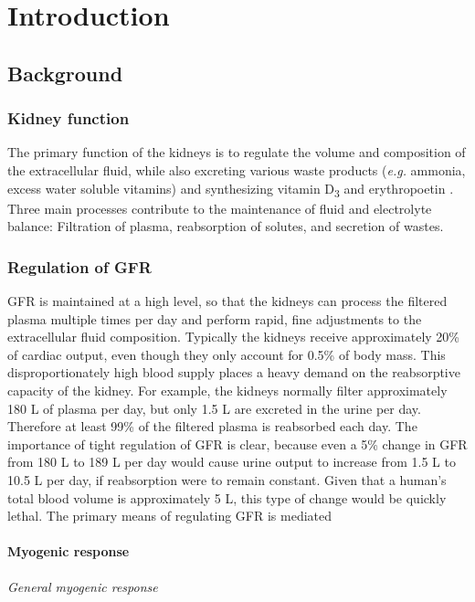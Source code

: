 \chapter{Introduction}

\section{Background}
	\subsection{Kidney function}
		The primary function of the kidneys is to regulate the volume and composition of the extracellular fluid, while also excreting various waste products (\emph{e.g.} ammonia, excess water soluble vitamins) and synthesizing vitamin D\textsubscript{3} and erythropoetin \cite{GuytonHall}. Three main processes contribute to the maintenance of fluid and electrolyte balance: Filtration of plasma, reabsorption of solutes, and secretion of wastes.
		
	\subsection{Regulation of GFR}
		GFR is maintained at a high level, so that the kidneys can process the filtered plasma multiple times per day and perform rapid, fine adjustments to the extracellular fluid composition. Typically the kidneys receive approximately 20\% of cardiac output, even though they only account for 0.5\% of body mass. This disproportionately high blood supply places a heavy demand on the reabsorptive capacity of the kidney. For example, the kidneys normally filter approximately 180 L of plasma per day, but only 1.5 L are excreted in the urine per day. Therefore at least 99\% of the filtered plasma is reabsorbed each day. The importance of tight regulation of GFR is clear, because even a 5\% change in GFR from 180 L to 189 L per day would cause urine output to increase from 1.5 L to 10.5 L per day, if reabsorption were to remain constant. Given that a human's total blood volume is approximately 5 L, this type of change would be quickly lethal. The primary means of regulating GFR is mediated
		\subsubsection{Myogenic response}
			\emph{General myogenic response}\\
			

